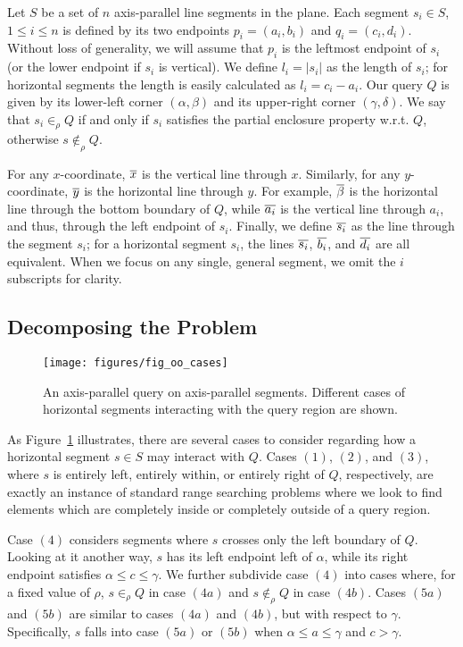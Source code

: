 Let $S$ be a set of $n$ axis-parallel line segments in the plane.
Each segment $s_i \in S$, $1 \leq i \leq n$ is defined by its two endpoints $p_i = (a_i, b_i)$ and $q_i = (c_i, d_i)$. 
Without loss of generality, we will assume that $p_i$ is the leftmost endpoint of $s_i$ (or the lower endpoint if $s_i$ is vertical). 
We define $l_i = |s_i|$ as the length of $s_i$; for horizontal segments the length is easily calculated as $l_i = c_i - a_i$. 
Our query $Q$ is given by its lower-left corner $(\alpha, \beta)$ and its upper-right corner $(\gamma, \delta)$. 
We say that $s_i \in_\rho Q$ if and only if $s_i$ satisfies the partial enclosure property w.r.t. $Q$, otherwise $s \not \in_\rho Q$.

For any $x$-coordinate, $\overline{x}$ is the vertical line through $x$. Similarly, for any $y$-coordinate, $\overline{y}$ is the horizontal line through $y$. For example, $\overline{\beta}$ is the horizontal line through the bottom boundary of $Q$, while $\overline{a_i}$ is the vertical line through $a_i$, and thus, through the left endpoint of $s_i$. Finally, we define $\overline{s_i}$ as the line through the segment $s_i$; for a horizontal segment $s_i$, the lines $\overline{s_i}$, $\overline{b_i}$, and $\overline{d_i}$ are all equivalent. When we focus on any single, general segment, we omit the $i$ subscripts for clarity.


\subsection{Decomposing the Problem}
\label{:rectangles:ap:approach}

\begin{figure}[t]
\centering
\texttt{[image: figures/fig\_oo\_cases]}
\caption[The different cases of axis-parallel segments.]{An axis-parallel query on axis-parallel segments. Different cases of horizontal segments interacting with the query region are shown.}
\label{:fig:rectangles:ap:cases}
\end{figure}

As Figure~\ref{:fig:rectangles:ap:cases} illustrates, there are several cases to consider regarding how a horizontal segment $s \in S$ may interact with $Q$. Cases $(1)$, $(2)$, and $(3)$, where $s$ is entirely left, entirely within, or entirely right of $Q$, respectively, are exactly an instance of  standard range searching problems where we look to find elements which are completely inside or completely outside of a query region.  

Case $(4)$ considers segments where $s$ crosses only the left boundary of $Q$. 
Looking at it another way, $s$ has its left endpoint left of $\alpha$, while its right endpoint satisfies $\alpha \leq c \leq \gamma$.
We further subdivide case $(4)$ into cases where, for a fixed value of $\rho$, $s \in_\rho Q$ in case $(4a)$ and $s \not \in_\rho Q$ in case $(4b)$.
Cases $(5a)$ and $(5b)$ are similar to cases $(4a)$ and $(4b)$, but with respect to $\gamma$. 
Specifically, $s$ falls into case $(5a)$ or $(5b)$ when $\alpha \leq a \leq \gamma$ and $c > \gamma$. 

